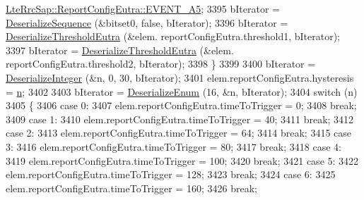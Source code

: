 \begin{DoxyCode}
      \hyperlink{structns3_1_1LteRrcSap_1_1ReportConfigEutra_ab8152dc095987f60bee2e9115046902fae92d8c286b3b1a6e39edc844df72588c}{LteRrcSap::ReportConfigEutra::EVENT\_A5};
3395                       bIterator = \hyperlink{classns3_1_1Asn1Header_a58c68bb97ba3fe2e8fcdd7c208d672b2}{DeserializeSequence} (&bitset0, \textcolor{keyword}{false}, bIterator);
3396                       bIterator = \hyperlink{classns3_1_1RrcAsn1Header_a80f5e686675bee0701149a16b9f2d37b}{DeserializeThresholdEutra} (&elem.
      reportConfigEutra.threshold1, bIterator);
3397                       bIterator = \hyperlink{classns3_1_1RrcAsn1Header_a80f5e686675bee0701149a16b9f2d37b}{DeserializeThresholdEutra} (&elem.
      reportConfigEutra.threshold2, bIterator);
3398                     \}
3399 
3400                   bIterator = \hyperlink{classns3_1_1Asn1Header_a49802c9af30018b078150e866b6ecae2}{DeserializeInteger} (&n, 0, 30, bIterator);
3401                   elem.reportConfigEutra.hysteresis = \hyperlink{namespacesample-rng-plot_aeb5ee5c431e338ef39b7ac5431242e1d}{n};
3402 
3403                   bIterator = \hyperlink{classns3_1_1Asn1Header_a4fcc253e0eec3483c775b005c1875f2d}{DeserializeEnum} (16, &n, bIterator);
3404                   \textcolor{keywordflow}{switch} (n)
3405                     \{
3406                     \textcolor{keywordflow}{case} 0:
3407                       elem.reportConfigEutra.timeToTrigger = 0;
3408                       \textcolor{keywordflow}{break};
3409                     \textcolor{keywordflow}{case} 1:
3410                       elem.reportConfigEutra.timeToTrigger = 40;
3411                       \textcolor{keywordflow}{break};
3412                     \textcolor{keywordflow}{case} 2:
3413                       elem.reportConfigEutra.timeToTrigger = 64;
3414                       \textcolor{keywordflow}{break};
3415                     \textcolor{keywordflow}{case} 3:
3416                       elem.reportConfigEutra.timeToTrigger = 80;
3417                       \textcolor{keywordflow}{break};
3418                     \textcolor{keywordflow}{case} 4:
3419                       elem.reportConfigEutra.timeToTrigger = 100;
3420                       \textcolor{keywordflow}{break};
3421                     \textcolor{keywordflow}{case} 5:
3422                       elem.reportConfigEutra.timeToTrigger = 128;
3423                       \textcolor{keywordflow}{break};
3424                     \textcolor{keywordflow}{case} 6:
3425                       elem.reportConfigEutra.timeToTrigger = 160;
3426                       \textcolor{keywordflow}{break};

\end{DoxyCode}
